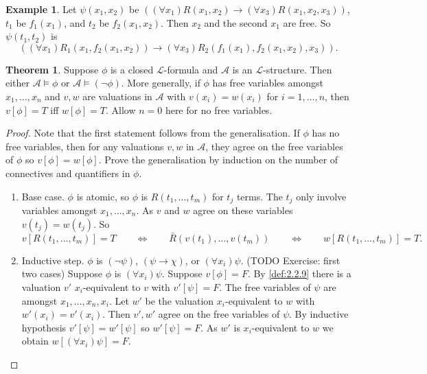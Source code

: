 \documentclass{article}
\newcommand{\rb}[1]{\left( #1 \right)}
\renewcommand{\sb}[1]{\left[ #1 \right]}
\newcommand{\notb}[1]{\rb{\neg #1}}
\newcommand{\impb}[2]{\rb{#1 \rightarrow #2}}
\newcommand{\fab}[1]{\rb{\forall #1}}
\theoremstyle{definition}\newtheorem{definition}{Definition}[subsection]
\theoremstyle{definition}\newtheorem{remark}[definition]{Remark}
\theoremstyle{definition}\newtheorem*{example}{Example}
\theoremstyle{definition}\newtheorem*{note}{Note}
\newtheorem{theorem}[definition]{Theorem}
\begin{document}
\begin{example}
Let $ \psi\rb{x_1, x_2} $ be $ \impb{\fab{x_1}R\rb{x_1, x_2}}{\fab{x_3}R\rb{x_1, x_2, x_3}} $, $ t_1 $ be $ f_1\rb{x_1} $, and $ t_2 $ be $ f_2\rb{x_1, x_2} $. Then $ x_2 $ and the second $ x_1 $ are free. So $ \psi\rb{t_1, t_2} $ is
$$ \impb{\fab{x_1}R_1\rb{x_1, f_2\rb{x_1, x_2}}}{\fab{x_3}R_2\rb{f_1\rb{x_1}, f_2\rb{x_1, x_2}, x_3}}. $$
\end{example}

\begin{theorem}
\label{thm:2.3.3}
Suppose $ \phi $ is a closed $ \mathcal{L} $-formula and $ \mathcal{A} $ is an $ \mathcal{L} $-structure. Then either $ \mathcal{A} \vDash \phi $ or $ \mathcal{A} \vDash \notb{\phi} $. More generally, if $ \phi $ has free variables amongst $ x_1, \dots, x_n $ and $ v, w $ are valuations in $ \mathcal{A} $ with $ v\rb{x_i} = w\rb{x_i} $ for $ i = 1, \dots, n $, then $ v\sb{\phi} = T $ iff $ w\sb{\phi} = T $. Allow $ n = 0 $ here for no free variables.
\end{theorem}

\begin{proof}
Note that the first statement follows from the generalisation. If $ \phi $ has no free variables, then for any valuations $ v, w $ in $ \mathcal{A} $, they agree on the free variables of $ \phi $ so $ v\sb{\phi} = w\sb{\phi} $. Prove the generalisation by induction on the number of connectives and quantifiers in $ \phi $.
\begin{enumerate}
\item Base case. $ \phi $ is atomic, so $ \phi $ is $ R\rb{t_1, \dots, t_m} $ for $ t_j $ terms. The $ t_j $ only involve variables amongst $ x_1, \dots, x_n $. As $ v $ and $ w $ agree on these variables $ v\rb{t_j} = w\rb{t_j} $. So
$$ v\sb{R\rb{t_1, \dots, t_m}} = T \qquad \iff \qquad \bar{R}\rb{v\rb{t_1}, \dots, v\rb{t_m}} \qquad \iff \qquad w\sb{R\rb{t_1, \dots, t_m}} = T. $$
\item Inductive step. $ \phi $ is $ \notb{\psi} $, $ \impb{\psi}{\chi} $, or $ \fab{x_i}\psi $. (TODO Exercise: first two cases) Suppose $ \phi $ is $ \fab{x_i}\psi $. Suppose $ v\sb{\phi} = F $. By \ref{def:2.2.9} there is a valuation $ v' $ $ x_i $-equivalent to $ v $ with $ v'\sb{\psi} = F $. The free variables of $ \psi $ are amongst $ x_1, \dots, x_n, x_i $. Let $ w' $ be the valuation $ x_i $-equivalent to $ w $ with $ w'\rb{x_i} = v'\rb{x_i} $. Then $ v', w' $ agree on the free variables of $ \psi $. By inductive hypothesis $ v'\sb{\psi} = w'\sb{\psi} $ so $ w'\sb{\psi} = F $. As $ w' $ is $ x_i $-equivalent to $ w $ we obtain $ w\sb{\fab{x_i}\psi} = F $.
\end{enumerate}
\end{proof}
\end{document}
